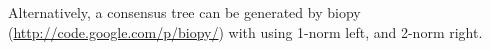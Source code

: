 \documentclass{article}
\begin{document}
Alternatively, a consensus tree can be generated by biopy (\url{http://code.google.com/p/biopy/})
with using 1-norm left, and 2-norm right.

\end{document}
